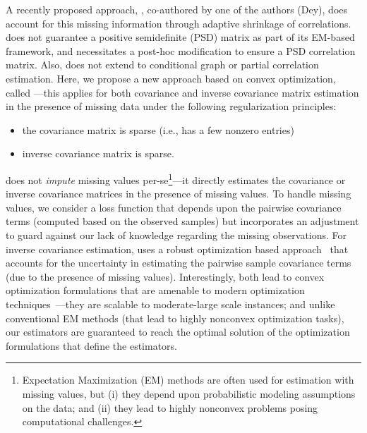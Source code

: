 A recently proposed approach, \CorShrink{}\cite{dey2019}, co-authored by one of the authors (Dey), does account for this missing information through adaptive shrinkage\cite{stephens2016} of correlations. \CorShrink{} does not guarantee a positive semidefinite (PSD) matrix as part of its EM-based framework, and necessitates a post-hoc modification to ensure a PSD correlation matrix. Also, \CorShrink{} does not extend to conditional graph or partial correlation estimation. Here, we propose a new approach based on convex optimization, called \Robocov{}---this applies for both covariance and inverse covariance matrix estimation in the presence of missing data under the following regularization principles:
\begin{itemize}
    \item the covariance matrix is sparse (i.e., has a few nonzero entries)
    \item inverse covariance matrix is sparse. 
\end{itemize}
\Robocov{} does not \emph{impute} missing values per-se\footnote{Expectation Maximization (EM)\cite{Dempster1977} methods are often used for estimation with missing values, but (i) they depend upon probabilistic modeling assumptions on the data; and (ii) they lead to highly nonconvex problems
posing computational challenges.}---it directly estimates the covariance or inverse covariance matrices in the presence of missing values. To handle missing values, we consider a loss function that depends upon the pairwise covariance terms (computed based on the observed samples) but incorporates an adjustment
to guard against our lack of knowledge regarding the missing observations. 
For inverse covariance estimation, \Robocov{} uses a robust optimization based approach~\cite{ben2009robust,bertsimas2011theory} that accounts for the uncertainty in estimating the pairwise sample covariance terms (due to the presence of missing values). Interestingly, both lead to convex optimization formulations that are amenable to modern optimization techniques~\cite{BV2004}---they are scalable to moderate-large scale instances; and unlike conventional EM methods (that lead to highly nonconvex optimization tasks), our estimators are guaranteed to reach the optimal solution of the optimization formulations that define the 
\Robocov{} estimators. 

